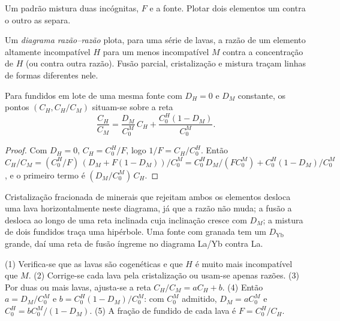 Um padrão mistura duas incógnitas, $F$ e a fonte. Plotar dois elementos
um contra o outro as separa.

\begin{definition}\label{def:b3:trace-element-modelling:ratios}
Um \emph{diagrama razão--razão} plota, para uma série
de lavas, a razão de um elemento altamente incompatível $H$ para um menos
incompatível $M$ contra a concentração de $H$ (ou contra outra
razão). Fusão parcial, cristalização e mistura traçam linhas de formas
diferentes nele.
\end{definition}

\begin{proposition}\label{prop:b3:trace-element-modelling:line}
Para fundidos em lote de uma mesma fonte com $D_H = 0$ e $D_M$ constante, os pontos
$(C_H, C_H/C_M)$ situam-se sobre a reta
\[
\frac{C_H}{C_M} = \frac{D_M}{C_0^M}\,C_H + \frac{C_0^H(1 - D_M)}{C_0^M}.
\]
\end{proposition}

\begin{proof}
Com $D_H = 0$, $C_H = C_0^H/F$, logo $1/F = C_H/C_0^H$. Então
$C_H/C_M = (C_0^H/F)\,(D_M + F(1 - D_M))/C_0^M = C_0^HD_M/(FC_0^M) +
C_0^H(1 - D_M)/C_0^M$, e o primeiro termo é $(D_M/C_0^M)\,C_H$.
\end{proof}

Cristalização fracionada de minerais que rejeitam ambos os elementos desloca uma lava
horizontalmente neste diagrama, já que a razão não muda; a fusão a desloca
ao longo de uma reta inclinada cuja inclinação cresce com $D_M$; a mistura de dois fundidos traça uma
hipérbole. Uma fonte com granada tem um $D_{\mathrm{Yb}}$ grande, daí uma reta de fusão íngreme
no diagrama La/Yb contra La.

\begin{method}\label{met:b3:trace-element-modelling:invert}
(1) Verifica-se que as lavas são cogenéticas e que $H$ é muito mais incompatível
que $M$. (2) Corrige-se cada lava pela cristalização ou usam-se apenas razões.
(3) Por duas ou mais lavas, ajusta-se a reta $C_H/C_M = aC_H + b$. (4) Então
$a = D_M/C_0^M$ e $b = C_0^H(1 - D_M)/C_0^M$: com $C_0^M$ admitido, $D_M =
aC_0^M$ e $C_0^H = bC_0^M/(1 - D_M)$. (5) A fração de fundido de cada lava é
$F = C_0^H/C_H$.
\end{method}

